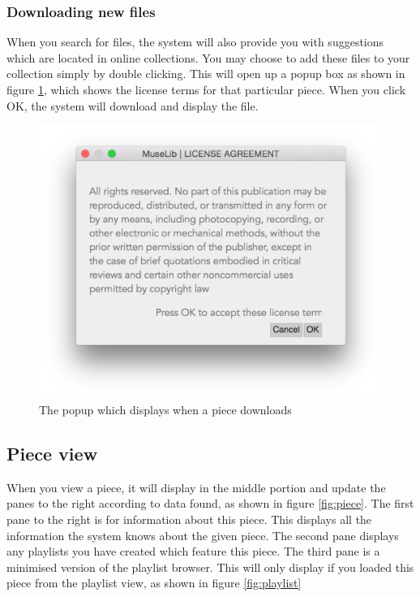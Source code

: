 \subsubsection{Downloading new files}
When you search for files, the system will also provide you with suggestions which are located in online collections. You may choose to add these files to your collection simply by double clicking. This will open up a popup box as shown in figure \ref{fig:license}, which shows the license terms for that particular piece. When you click OK, the system will download and display the file.
\begin{figure}[H]
\centering
\includegraphics[width=400pt]{licensepop}
\caption{The popup which displays when a piece downloads}
\label{fig:license}	
\end{figure}

\subsection{Piece view}
When you view a piece, it will display in the middle portion and update the panes to the right according to data found, as shown in figure \ref{fig:piece}. The first pane to the right is for information about this piece. This displays all the information the system knows about the given piece.
The second pane displays any playlists you have created which feature this piece.
The third pane is a minimised version of the playlist browser. This will only display if you loaded this piece from the playlist view, as shown in figure \ref{fig:playlist}

